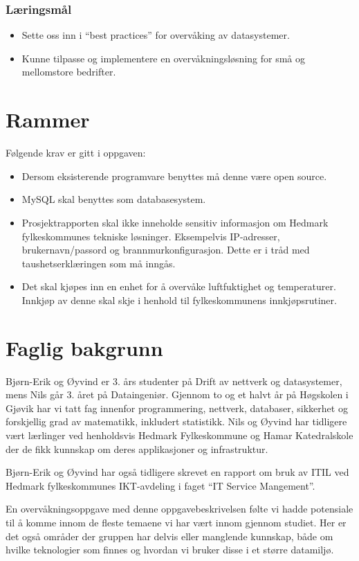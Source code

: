\subsubsection{Læringsmål}
\begin{itemize}
	\item Sette oss inn i “best practices” for overvåking av datasystemer.
	\item Kunne tilpasse og implementere en overvåkningsløsning for små og mellomstore bedrifter.
\end{itemize}

\section{Rammer}
Følgende krav er gitt i oppgaven:
\begin{itemize}
	\item Dersom eksisterende programvare benyttes må denne være open source.
	\item MySQL skal benyttes som databasesystem.
	\item Prosjektrapporten skal ikke inneholde sensitiv informasjon om Hedmark fylkeskommunes tekniske løsninger. Eksempelvis IP-adresser, brukernavn/passord og brannmurkonfigurasjon. Dette er i tråd med taushetserklæringen som må inngås.
	\item Det skal kjøpes inn en enhet for å overvåke luftfuktighet og temperaturer. Innkjøp av denne skal skje i henhold til fylkeskommunens innkjøpsrutiner.
\end{itemize}

\section{Faglig bakgrunn}


Bjørn-Erik og Øyvind er 3. års studenter på Drift av nettverk og datasystemer, mens Nils går 3. året på Dataingeniør. Gjennom to og et halvt år på Høgskolen i Gjøvik har vi tatt fag innenfor programmering, nettverk, databaser, sikkerhet og forskjellig grad av matematikk, inkludert statistikk. Nils og Øyvind har tidligere vært lærlinger ved henholdsvis Hedmark Fylkeskommune og Hamar Katedralskole der de fikk kunnskap om deres applikasjoner og infrastruktur.

Bjørn-Erik og Øyvind har også tidligere skrevet en rapport om bruk av ITIL ved Hedmark fylkeskommunes IKT-avdeling i faget “IT Service Mangement”.

En overvåkningsoppgave med denne oppgavebeskrivelsen følte vi hadde potensiale til å komme innom de fleste temaene vi har vært innom gjennom studiet. Her er det også områder der gruppen har delvis eller manglende kunnskap, både om hvilke teknologier som finnes og hvordan vi bruker disse i et større datamiljø.

